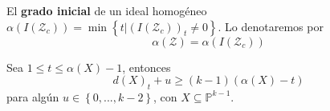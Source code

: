 \documentclass[12pt]{report}
\theoremstyle{largebreak}
\begin{document}
    \begin{mydef}
        El \textbf{grado inicial} de un ideal homogéneo $\alpha(I(\mathcal{Z}_c))=\min\left\{t\big|(I(\mathcal{Z}_c))_t\neq0 \right\}$. Lo denotaremos por
        \begin{equation*}
            \alpha(\mathcal{Z})=\alpha(I(\mathcal{Z}_c))
        \end{equation*}
    \end{mydef}

    \begin{propo}
        Sea $1\leq t\leq\alpha(X)-1$, entonces
        \begin{equation*}
            d(X)_t+u\geq(k-1)(\alpha(X)-t)
        \end{equation*}
        para algún $u\in\left\{0,...,k-2 \right\}$, con $X\subseteq\mathbb{P}^{ k-1}$.
    \end{propo}
\end{document}
